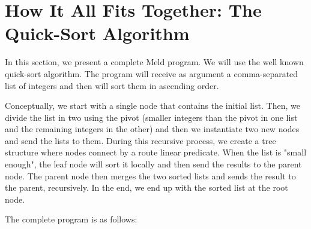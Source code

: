 \documentclass[11pt]{article}
\begin{document}
\section{How It All Fits Together: The Quick-Sort Algorithm}

In this section, we present a complete Meld program. We will use the well known quick-sort algorithm. The program will receive as argument a comma-separated list of integers and then will sort them in ascending order.

Conceptually, we start with a single node that contains the initial list. Then, we divide the list in two using the pivot (smaller integers than the pivot in one list and the remaining integers in the other) and then we instantiate two new nodes and send the lists to them. During this recursive process, we create a tree structure where nodes connect by a route linear predicate. When the list is "small enough", the leaf node will sort it locally and then send the results to the parent node. The parent node then merges the two sorted lists and sends the result to the parent, recursively. In the end, we end up with the sorted list at the root node.

The complete program is as follows:
\end{document}
